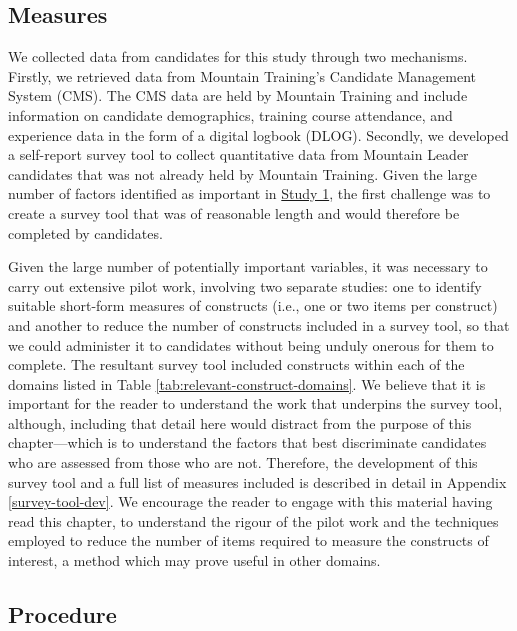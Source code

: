 \documentclass[
  12pt,
  a4paper,
]{book}
\begin{document}
\hypertarget{pra-measures}{%
\subsection{Measures}\label{pra-measures}}

We collected data from candidates for this study through two mechanisms. Firstly, we retrieved data from Mountain Training's Candidate Management System (CMS). The CMS data are held by Mountain Training and include information on candidate demographics, training course attendance, and experience data in the form of a digital logbook (DLOG). Secondly, we developed a self-report survey tool to collect quantitative data from Mountain Leader candidates that was not already held by Mountain Training. Given the large number of factors identified as important in \protect\hyperlink{ml-qualitative}{Study 1}, the first challenge was to create a survey tool that was of reasonable length and would therefore be completed by candidates.

Given the large number of potentially important variables, it was necessary to carry out extensive pilot work, involving two separate studies: one to identify suitable short-form measures of constructs (i.e., one or two items per construct) and another to reduce the number of constructs included in a survey tool, so that we could administer it to candidates without being unduly onerous for them to complete. The resultant survey tool included constructs within each of the domains listed in Table \ref{tab:relevant-construct-domains}. We believe that it is important for the reader to understand the work that underpins the survey tool, although, including that detail here would distract from the purpose of this chapter---which is to understand the factors that best discriminate candidates who are assessed from those who are not. Therefore, the development of this survey tool and a full list of measures included is described in detail in Appendix \ref{survey-tool-dev}. We encourage the reader to engage with this material having read this chapter, to understand the rigour of the pilot work and the techniques employed to reduce the number of items required to measure the constructs of interest, a method which may prove useful in other domains.

\hypertarget{pra-procedure}{%
\subsection{Procedure}\label{pra-procedure}}
\end{document}

